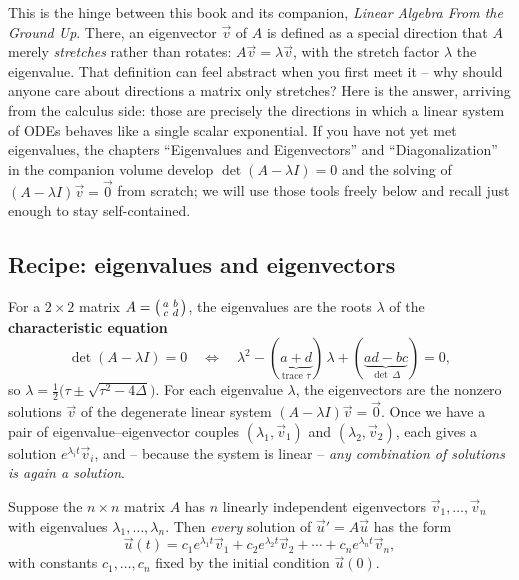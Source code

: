 \begin{connectionbox}
This is the hinge between this book and its companion, \emph{Linear Algebra From
the Ground Up}. There, an eigenvector $\vec v$ of $A$ is defined as a special
direction that $A$ merely \emph{stretches} rather than rotates: $A\vec v =
\lambda\vec v$, with the stretch factor $\lambda$ the eigenvalue. That definition
can feel abstract when you first meet it -- why should anyone care about
directions a matrix only stretches? Here is the answer, arriving from the
calculus side: those are precisely the directions in which a linear system of
ODEs behaves like a single scalar exponential. If you have not yet met
eigenvalues, the chapters ``Eigenvalues and Eigenvectors'' and
``Diagonalization'' in the companion volume develop $\det(A-\lambda I)=0$ and the
solving of $(A-\lambda I)\vec v = \vec 0$ from scratch; we will use those tools
freely below and recall just enough to stay self-contained.
\end{connectionbox}

\subsection{Recipe: eigenvalues and eigenvectors}

For a $2\times 2$ matrix
$A=\begin{psmallmatrix} a & b\\ c & d\end{psmallmatrix}$, the eigenvalues are the
roots $\lambda$ of the \textbf{characteristic equation}
\[
  \det(A - \lambda I) = 0
  \quad\Longleftrightarrow\quad
  \lambda^2 - (\underbrace{a+d}_{\text{trace }\tau})\,\lambda
  + (\underbrace{ad-bc}_{\det\,\Delta}) = 0,
\]
so $\lambda = \tfrac{1}{2}\big(\tau \pm \sqrt{\tau^2 - 4\Delta}\big)$. For each
eigenvalue $\lambda$, the eigenvectors are the nonzero solutions $\vec v$ of the
degenerate linear system $(A-\lambda I)\vec v = \vec 0$. Once we have a pair of
eigenvalue--eigenvector couples $(\lambda_1, \vec v_1)$ and $(\lambda_2, \vec
v_2)$, each gives a solution $e^{\lambda_i t}\vec v_i$, and -- because the system
is linear -- \emph{any combination of solutions is again a solution}.

\begin{theorem}
\label{ch39:thm-gensol}
Suppose the $n\times n$ matrix $A$ has $n$ linearly independent eigenvectors
$\vec v_1, \dots, \vec v_n$ with eigenvalues $\lambda_1, \dots, \lambda_n$. Then
\emph{every} solution of $\vec u' = A\vec u$ has the form
\[
  \vec u(t) = c_1 e^{\lambda_1 t}\vec v_1
            + c_2 e^{\lambda_2 t}\vec v_2
            + \cdots
            + c_n e^{\lambda_n t}\vec v_n,
\]
with constants $c_1, \dots, c_n$ fixed by the initial condition $\vec u(0)$.
\end{theorem}

